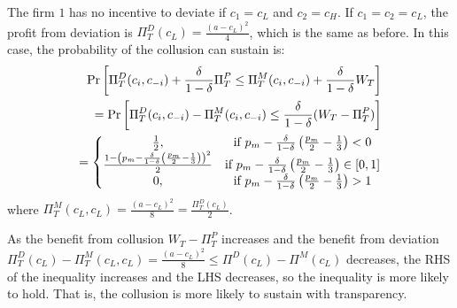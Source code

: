 \documentclass[12pt]{article}
\begin{document}
The firm $1$ has no incentive to deviate if $c_1=c_L$ and $c_2=c_H$. If $c_1=c_2=c_L$, the profit from deviation is $\Pi^D_T(c_L)=\frac{(a-c_L)^2}{4}$, which is the same as before. In this case, the probability of the collusion can sustain is:
\begin{equation}
    \begin{aligned}
        \textnormal{Pr}\left[\Pi^D_T(c_i,c_{-i})+\frac{\delta}{1-\delta}\Pi^P_T\leq \Pi^M_T(c_i,c_{-i})+\frac{\delta}{1-\delta}W_T\right]\\
        =\textnormal{Pr}\left[\Pi^D_T(c_i,c_{-i})-\Pi^M_T(c_i,c_{-i})\leq \frac{\delta}{1-\delta}(W_T-\Pi^P_T)\right]\\
        =\left\{\begin{matrix}
            \frac{1}{2},&\text{if }p_m-\frac{\delta}{1-\delta}\left(\frac{p_m}{2}-\frac{1}{3}\right)<0\\
            \frac{1-\left(p_m-\frac{\delta}{1-\delta}\left(\frac{p_m}{2}-\frac{1}{3}\right)\right)^2}{2}&\text{if }p_m-\frac{\delta}{1-\delta}\left(\frac{p_m}{2}-\frac{1}{3}\right)\in[0,1]\\
            0,&\text{if }p_m-\frac{\delta}{1-\delta}\left(\frac{p_m}{2}-\frac{1}{3}\right)>1
        \end{matrix}\right.
    \end{aligned}
    \nonumber
\end{equation}
where $\Pi^M_T(c_L,c_L)=\frac{(a-c_L)^2}{8}=\frac{\Pi^D_T(c_L)}{2}$.

As the benefit from collusion $W_T-\Pi^P_T$ increases and the benefit from deviation $\Pi^D_T(c_L)-\Pi^M_T(c_L,c_L)=\frac{(a-c_L)^2}{8}\leq\Pi^D(c_L)-\Pi^M(c_L)$ decreases, the RHS of the inequality increases and the LHS decreases, so the inequality is more likely to hold. That is, the collusion is more likely to sustain with transparency.
\end{document}
